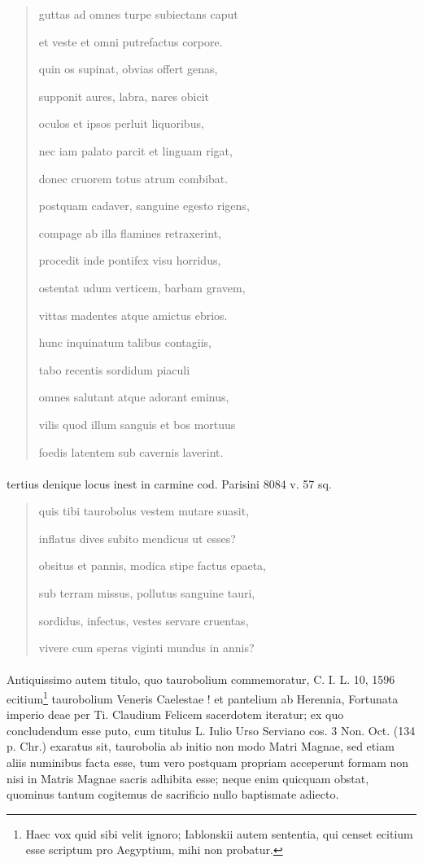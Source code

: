 \documentclass[a4paper, 11pt, oneside, polutonikogreek, german]{article}
\begin{document}
\begin{quotation}
guttas ad omnes turpe subiectans caput

et veste et omni putrefactus corpore.

\bigskip

quin os supinat, obvias offert genas,

supponit aures, labra, nares obicit

oculos et ipsos perluit liquoribus,

nec iam palato parcit et linguam rigat,

donec cruorem totus atrum combibat.

\bigskip

postquam cadaver, sanguine egesto rigens,

compage ab illa flamines retraxerint,

procedit inde pontifex visu horridus,

ostentat udum verticem, barbam gravem,

vittas madentes atque amictus ebrios.

\bigskip

hunc inquinatum talibus contagiis,

tabo recentis sordidum piaculi

omnes salutant atque adorant eminus,

vilis quod illum sanguis et bos mortuus

foedis latentem sub cavernis laverint.
\end{quotation}
\paragraph{}
tertius denique locus inest in carmine cod. Parisini 8084 v. 57 sq.
\begin{quotation}
quis tibi taurobolus vestem mutare suasit,

inflatus dives subito mendicus ut esses?

obsitus et pannis, modica stipe factus epaeta,

sub terram missus, pollutus sanguine tauri,

sordidus, infectus, vestes servare cruentas,

vivere cum speras viginti mundus in annis?
\end{quotation}
\paragraph{}
Antiquissimo autem titulo, quo taurobolium commemoratur, C. I. L. 10, 1596 ecitium\footnote{Haec vox quid sibi velit ignoro; Iablonskii autem sententia, qui censet ecitium esse scriptum pro Aegyptium, mihi non probatur.} taurobolium Veneris Caelestae ! et pantelium ab Herennia, Fortunata imperio deae per Ti. Claudium Felicem sacerdotem iteratur; ex quo concludendum esse puto, cum titulus L. Iulio Urso Serviano cos. 3 Non. Oct. (134 p. Chr.) exaratus sit, taurobolia ab initio non modo Matri Magnae, sed etiam aliis numinibus facta esse, tum vero postquam propriam acceperunt formam non nisi in Matris Magnae sacris adhibita esse; neque enim quicquam obstat, quominus tantum cogitemus de sacrificio nullo baptismate adiecto.
\end{document}
